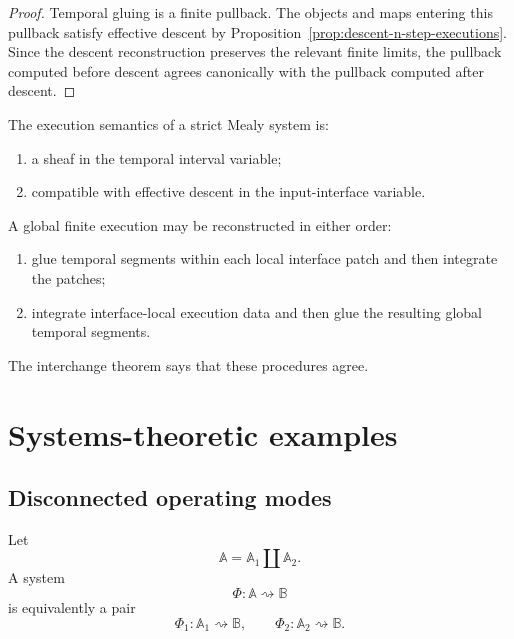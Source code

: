 \begin{proof}
Temporal gluing is a finite pullback. The objects and maps entering this
pullback satisfy effective descent by
Proposition~\ref{prop:descent-n-step-executions}. Since the descent
reconstruction preserves the relevant finite limits, the pullback computed
before descent agrees canonically with the pullback computed after descent.
\end{proof}

\begin{corollary}
\label{cor:double-locality-execution}
The execution semantics of a strict Mealy system is:
\begin{enumerate}
    \item a sheaf in the temporal interval variable;
    \item compatible with effective descent in the input-interface variable.
\end{enumerate}
\end{corollary}

\begin{remark}
\label{rem:systems-interpretation-interchange}
A global finite execution may be reconstructed in either order:
\begin{enumerate}
    \item glue temporal segments within each local interface patch and then
    integrate the patches;
    \item integrate interface-local execution data and then glue the resulting
    global temporal segments.
\end{enumerate}
The interchange theorem says that these procedures agree.
\end{remark}

\section{Systems-theoretic examples}
\label{sec:systems-theoretic-descent-examples}

\subsection{Disconnected operating modes}
\label{subsec:example-disconnected-operating-modes}

Let
\[
    \mathbb A=\mathbb A_1\amalg\mathbb A_2.
\]
A system
\[
    \Phi:\mathbb A\rightsquigarrow\mathbb B
\]
is equivalently a pair
\[
    \Phi_1:\mathbb A_1\rightsquigarrow\mathbb B,
    \qquad
    \Phi_2:\mathbb A_2\rightsquigarrow\mathbb B.
\]

